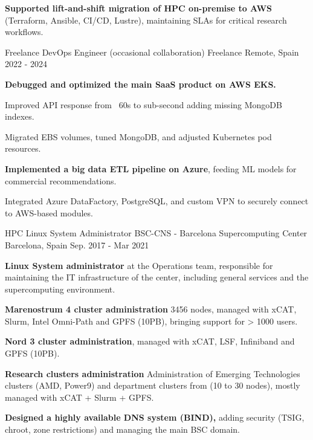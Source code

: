 \begin{cventries}
{\begin{cvitems}
\item{\textbf{Supported lift-and-shift migration of HPC on-premise to AWS} (Terraform, Ansible, CI/CD, Lustre), maintaining SLAs for critical research workflows.}
\end{cvitems}
}
\cventry
{Freelance DevOps Engineer (occasional collaboration)} %
{Freelance} %
{Remote, Spain} %
{2022 - 2024} %
{ %
\begin{cvitems}
\item{\textbf{Debugged and optimized the main SaaS product on AWS EKS.}}
\item{Improved API response from ~60s to sub-second adding missing MongoDB indexes.}
\item{Migrated EBS volumes, tuned MongoDB, and adjusted Kubernetes pod resources.}
\item{\textbf{Implemented a big data ETL pipeline on Azure}, feeding ML models for commercial recommendations.}
\item{Integrated Azure DataFactory, PostgreSQL, and custom VPN to securely connect to AWS-based modules.}
\end{cvitems}
}
\cventry
{HPC Linux System Administrator} %
{BSC-CNS - Barcelona Supercomputing Center} %
{Barcelona, Spain} %
{Sep. 2017 - Mar 2021} %
{ %
\begin{cvitems}
\item{\textbf{Linux System administrator} at the Operations team, responsible for maintaining the IT infrastructure of the center, including general services and the supercomputing environment.}
\item{\textbf{Marenostrum 4 cluster administration} 3456 nodes, managed with xCAT, Slurm, Intel Omni-Path and GPFS (10PB), bringing support for > 1000 users.}
\item{\textbf{Nord 3 cluster administration}, managed with xCAT, LSF, Infiniband and GPFS (10PB).}
\item{\textbf{Research clusters administration} Administration of Emerging Technologies clusters (AMD, Power9) and department clusters from (10 to 30 nodes), mostly managed with xCAT + Slurm + GPFS.}
\item{\textbf{Designed a highly available DNS system (BIND),} adding security (TSIG, chroot, zone restrictions) and managing the main BSC domain.}

\end{cvitems}}
\end{cventries}
